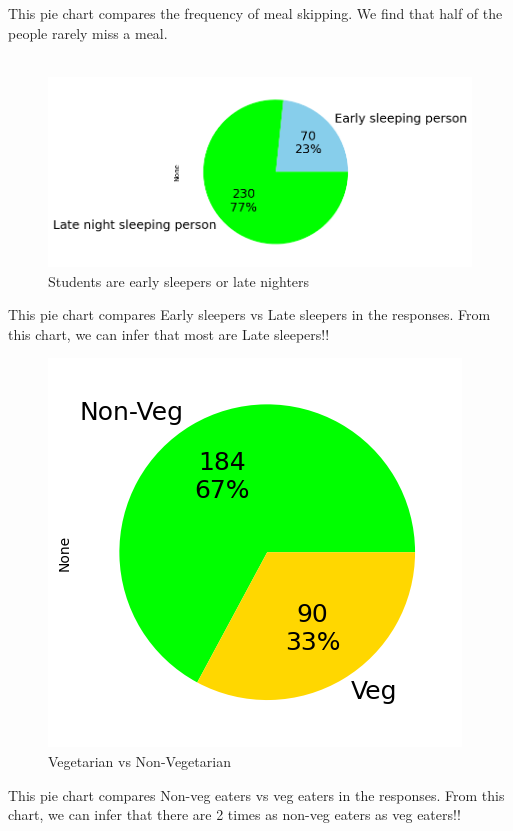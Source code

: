 \documentclass{article}
\begin{document}
This pie chart compares the frequency of meal skipping. We find that half of the people rarely miss a meal.\\\\
\begin{figure}[H]
    \hspace{-22mm}%
    \centering
    \includegraphics[scale = 0.75]{pie_sleep_categoty.png}
    \caption{Students are early sleepers or late nighters}  
    \label{Normality_plot}
\end{figure}
This pie chart compares Early sleepers vs Late sleepers in the responses. From this chart, we can infer that most are Late sleepers!!
\begin{figure}[H]
    \centering
    \includegraphics[scale = 0.9]{pie_veg_non-veg.png}
    \caption{Vegetarian vs Non-Vegetarian}  
    \label{Normality_plot}
\end{figure}
This pie chart compares Non-veg eaters vs veg eaters in the responses. From this chart, we can infer that there are 2 times as non-veg eaters as veg eaters!!
\end{document}
